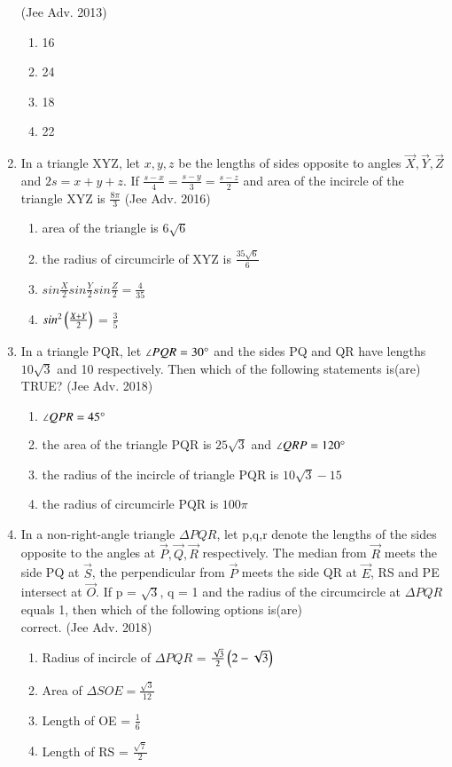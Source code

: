 \documentclass[journal,12pt,twocolumn]{IEEEtran}
\theoremstyle{remark}
\begin{document}
\begin{enumerate}
    \hfill{(Jee Adv. 2013)}
    \begin{multicols}{2}
    \begin{enumerate}
    \item 16
    \item 24
    \item 18
    \item 22
    \end{enumerate}
    \end{multicols}
    \item In a triangle XYZ, let $x,y,z$ be the lengths of sides opposite to angles $\vec{X},\vec{Y},\vec{Z}$ and $2s = x+y+z$. If ${\frac{s-x}{4}}={\frac{s-y}{3}}={\frac{s-z}{2}}$ and area of the incircle of the triangle XYZ is ${\frac{8\pi}{3}}$
    \hfill{(Jee Adv. 2016)}
    \begin{enumerate}
    \item area of the triangle is 6$\sqrt{6}$
    \item the radius of circumcirle of XYZ is ${\frac{35\sqrt{6}}{6}}$
    \item $sin\frac{X}{2}sin\frac{Y}{2}sin\frac{Z}{2} = \frac{4}{35}$
    \item $sin^{2}\left(\frac{X+Y}{2}\right)$ = $\frac{3}{5}$
    \end{enumerate}
    \item In a triangle PQR, let $\angle PQR = 30\degree$ and the sides PQ and QR have lengths $10\sqrt{3}$ and 10 respectively. Then which of the following statements is(are) TRUE?
    \hfill{(Jee Adv. 2018)}
    \begin{enumerate}
    \item $\angle QPR = 45\degree$
    \item the area of the triangle PQR is $25\sqrt{3}$ and $\angle QRP = 120\degree$
    \item the radius of the incircle of triangle PQR is $10\sqrt{3}-15$
    \item the radius of circumcirle PQR is $100\pi$
    \end{enumerate}
    \item In a non-right-angle triangle $\Delta PQR$, let p,q,r denote the lengths of the sides opposite to the angles at $\vec{P},\vec{Q},\vec{R}$ respectively. The median from $\vec{R}$ meets the side PQ at $\vec{S}$, the perpendicular from $\vec{P}$ meets the side QR at $\vec{E}$, RS and PE
	    intersect at $\vec{O}$. If p = $\sqrt{3}$, q = 1 and the radius of the circumcircle at $\Delta PQR$ equals 1, then which of the following options is(are)\\ correct.
    \hfill{(Jee Adv. 2018)}
    \begin{enumerate}
    \item Radius of incircle of $\Delta PQR$ = $\frac{\sqrt{3}}{2}\left(2-\sqrt{3}\right)$
    \item Area of $\Delta SOE = \frac{\sqrt{3}}{12}$
    \item Length of OE = $\frac{1}{6}$
    \item Length of RS = $\frac{\sqrt{7}}{2}$
    \end{enumerate}

\end{enumerate}
\end{document}
